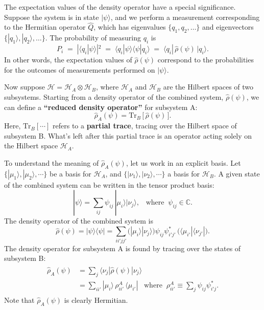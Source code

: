 \documentclass[pra,12pt]{revtex4}
\begin{document}
The expectation values of the density operator have a special
significance.  Suppose the system is in state $|\psi\rangle$, and we
perform a measurement corresponding to the Hermitian operator
$\hat{Q}$, which has eigenvalues $\{q_1,q_2,\dots\}$ and eigenvectors
$\{|q_1\rangle,|q_2\rangle,\dots\}$.  The probability of measuring
$q_i$ is
\begin{equation}
  P_i \;=\; |\langle q_i| \psi\rangle|^2 \;=\; \langle q_i |\psi\rangle \langle \psi|q_i\rangle \;=\; \langle q_i |\, \hat{\rho}(\psi)\, |q_i \rangle.
\end{equation}
In other words, the expectation values of $\hat{\rho}(\psi)$
correspond to the probabilities for the outcomes of measurements
performed on $|\psi\rangle$.

Now suppose $\mathscr{H} = \mathscr{H}_A \otimes \mathscr{H}_B$, where
$\mathscr{H}_A$ and $\mathscr{H}_B$ are the Hilbert spaces of two
subsystems.  Starting from a density operator of the combined system,
$\hat{\rho}(\psi)$, we can define a \textbf{``reduced density
  operator''} for subsystem A:
\begin{equation}
  \hat{\rho}_A(\psi) = \mathrm{Tr}_B \,\big[\,\hat{\rho}(\psi)\,\big].
\end{equation}
Here, $\mathrm{Tr}_B[\cdots]$ refers to a \textbf{partial trace},
tracing over the Hilbert space of subsystem B.  What's left after
this partial trace is an operator acting solely on the Hilbert space
$\mathscr{H}_A$.

To understand the meaning of $\hat{\rho}_A(\psi)$, let us work in
an explicit basis.  Let $\{|\mu_1\rangle, |\mu_2\rangle,\cdots\}$ be a
basis for $\mathscr{H}_A$, and $\{|\nu_1\rangle,
|\nu_2\rangle,\cdots\}$ a basis for $\mathscr{H}_B$.  A given state of
the combined system can be written in the tensor product basis:
\begin{equation}
  |\psi\rangle = \sum_{ij} \psi_{ij} \, |\mu_i\rangle  |\nu_j\rangle, \;\;\; \mathrm{where}\;\; \psi_{ij} \in \mathbb{C}.
\end{equation}
The density operator of the combined system is
\begin{equation}
  \hat{\rho}(\psi) = |\psi\rangle \langle\psi| = \sum_{ii'jj'} \Big( |\mu_i\rangle  |\nu_j\rangle\Big) \psi_{ij} \psi_{i'j'}^* \, \Big(\langle \mu_{i'}|  \langle \nu_{j'}|\Big).
\end{equation}
The density operator for subsystem A is found by tracing over
the states of subsystem B:
\begin{align}
  \begin{aligned}\hat{\rho}_A(\psi) &= \sum_j \langle \nu_j | \hat{\rho}(\psi) | \nu_j \rangle \\ &= \sum_{ii'} |\mu_i\rangle \,\rho_{ii'}^A \, \langle \mu_{i'}| \;\;\;\mathrm{where} \;\; \rho_{ii'}^A \equiv \sum_j \psi_{ij} \psi_{i'j}^*.\end{aligned}
\end{align}
Note that $\hat{\rho}_A(\psi)$ is clearly Hermitian.
\end{document}
